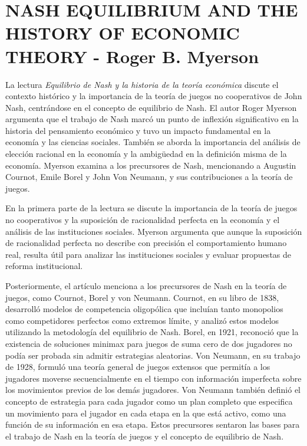 \documentclass[11pt]{article}
\begin{document}
\section{NASH EQUILIBRIUM AND THE HISTORY OF ECONOMIC THEORY - Roger B. Myerson}
\begin{flushleft}
    La lectura \textit{Equilibrio de Nash y la historia de la teoría económica} discute el contexto histórico y la importancia de la teoría de juegos no cooperativos de John Nash, centrándose en el concepto de equilibrio de Nash. El autor Roger Myerson argumenta que el trabajo de Nash marcó un punto de inflexión significativo en la historia del pensamiento económico y tuvo un impacto fundamental en la economía y las ciencias sociales. También se aborda la importancia del análisis de elección racional en la economía y la ambigüedad en la definición misma de la economía. Myerson examina a los precursores de Nash, mencionando a Augustin Cournot, Emile Borel y John Von Neumann, y sus contribuciones a la teoría de juegos.

    En la primera parte de la lectura se discute la importancia de la teoría de juegos no cooperativos y la suposición de racionalidad perfecta en la economía y el análisis de las instituciones sociales. Myerson argumenta que aunque la suposición de racionalidad perfecta no describe con precisión el comportamiento humano real, resulta útil para analizar las instituciones sociales y evaluar propuestas de reforma institucional.

    Posteriormente, el artículo menciona a los precursores de Nash en la teoría de juegos, como Cournot, Borel y von Neumann. Cournot, en su libro de 1838, desarrolló modelos de competencia oligopólica que incluían tanto monopolios como competidores perfectos como extremos límite, y analizó estos modelos utilizando la metodología del equilibrio de Nash. Borel, en 1921, reconoció que la existencia de soluciones minimax para juegos de suma cero de dos jugadores no podía ser probada sin admitir estrategias aleatorias. Von Neumann, en su trabajo de 1928, formuló una teoría general de juegos extensos que permitía a los jugadores moverse secuencialmente en el tiempo con información imperfecta sobre los movimientos previos de los demás jugadores. Von Neumann también definió el concepto de estrategia para cada jugador como un plan completo que especifica un movimiento para el jugador en cada etapa en la que está activo, como una función de su información en esa etapa. Estos precursores sentaron las bases para el trabajo de Nash en la teoría de juegos y el concepto de equilibrio de Nash.


\end{flushleft}
\end{document}
